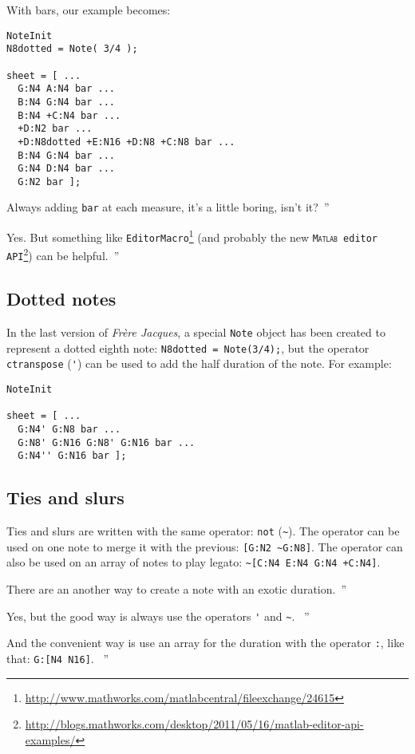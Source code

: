 \documentclass{article}
\newcommand{\matlab}{\textsc{Matlab}\xspace}
\newcommand{\note}{\lstinline!Note!\xspace}
\newcommand{\frerejaques}{\emph{Fr\`ere Jacques}\xspace}
\newcommand{\exchange}[2]{\texttt{#1}\footnote{\url{#2}}\xspace}
\newenvironment{meenv}{ \par \noindent \makebox[6em][r]{ \textcolor{mecolor}{Me}: `` --~}}{~''}
\newenvironment{myselfenv}{ \par \noindent \makebox[6em][r]{ \textcolor{myselfcolor}{Myself}: `` --~}}{~''}
\newcommand{\me}[1]{\begin{meenv}#1\end{meenv}}
\newcommand{\myself}[1]{\begin{myselfenv}#1\end{myselfenv}}
\begin{document}
With bars, our example becomes:
\begin{lstlisting}
NoteInit
N8dotted = Note( 3/4 );

sheet = [ ...
  G:N4 A:N4 bar ...
  B:N4 G:N4 bar ...
  B:N4 +C:N4 bar ...
  +D:N2 bar ...
  +D:N8dotted +E:N16 +D:N8 +C:N8 bar ...
  B:N4 G:N4 bar ...
  G:N4 D:N4 bar ...
  G:N2 bar ];
\end{lstlisting}

\me{Always adding \lstinline!bar! at each measure, it's a little boring, isn't it?}
\myself{Yes. But something like \exchange{EditorMacro}{http://www.mathworks.com/matlabcentral/fileexchange/24615} (and probably the new \exchange{\matlab editor API}{http://blogs.mathworks.com/desktop/2011/05/16/matlab-editor-api-examples/}) can be helpful.}

\subsection{Dotted notes}
\label{sec:TutoDottedNotes}

In the last version of \frerejaques, a special \note object has been created to represent a dotted eighth note: \lstinline!N8dotted = Note(3/4);!, but the operator \lstinline!ctranspose! (\lstinline!'!) can be used to add the half duration of the note. For example: \\

\begin{lstlisting}
NoteInit

sheet = [ ...
  G:N4' G:N8 bar ...
  G:N8' G:N16 G:N8' G:N16 bar ...
  G:N4'' G:N16 bar ];
\end{lstlisting}

\subsection{Ties and slurs}

Ties and slurs are written with the same operator: \lstinline!not! (\lstinline!~!). The operator can be used on one note to merge it with the previous: \lstinline![G:N2 ~G:N8]!. The operator can also be used on an array of notes to play legato: \lstinline!~[C:N4 E:N4 G:N4 +C:N4]!.

\me{There are an another way to create a note with an exotic duration.}
\begin{myselfenv}%
  Yes, but the good way is always use the operators \lstinline!'! and \lstinline!~!.%
\end{myselfenv}
\begin{meenv}%
  And the convenient way is use an array for the duration with the operator \lstinline!:!, like that: \lstinline!G:[N4 N16]!.%
\end{meenv}
\end{document}
